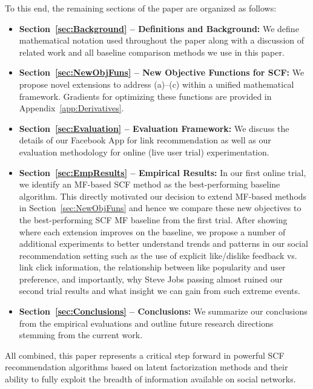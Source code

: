 To this end, the remaining sections of the paper are organized as follows:
\begin{itemize}
\item {\bf Section~\ref{sec:Background} -- Definitions and Background:} 
We define mathematical notation used throughout the paper along
with a discussion of related work and all baseline comparison methods
we use in this paper.
\item {\bf Section~\ref{sec:NewObjFuns} -- New Objective Functions for
SCF:} We propose novel extensions to address (a)--(c) within a unified
mathematical framework.  Gradients for optimizing these functions
are provided in Appendix~\ref{app:Derivatives}.
\item {\bf Section~\ref{sec:Evaluation} -- Evaluation Framework:} We
discuss the details of our Facebook App for link
recommendation as well as our evaluation methodology for 
online (live user trial) experimentation.  
\item {\bf Section~\ref{sec:EmpResults} -- Empirical Results:} In our
first online trial, we identify an MF-based SCF method as the
best-performing baseline algorithm.  This directly motivated our
decision to extend MF-based methods in Section~\ref{sec:NewObjFuns}
and hence we compare these new objectives to the best-performing SCF
MF baseline from the first trial.  After showing where each extension
improves on the baseline, we propose a number of additional
experiments to better understand trends and patterns in our social
recommendation setting such as the use of explicit like/dislike
feedback vs. link click information, the relationship between like
popularity and user preference, and importantly, why Steve Jobs
passing almost ruined our second trial results and what insight we can
gain from such extreme events.
\item {\bf Section~\ref{sec:Conclusions} -- Conclusions:} We summarize
our conclusions from the empirical evaluations and outline 
future research directions stemming from the current work.
\end{itemize}

All combined, this paper represents a critical step forward in
powerful SCF recommendation algorithms based on latent factorization
methods and their ability to fully exploit the breadth of information
available on social networks.
